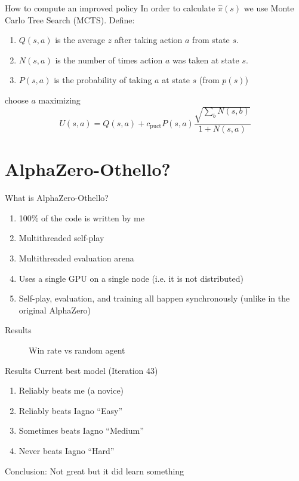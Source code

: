\documentclass{beamer}
\begin{document}
\begin{frame}{How to compute an improved policy}
  In order to calculate \(\hat{\pi}(s)\) we use Monte Carlo Tree Search (MCTS). Define:
  \begin{enumerate}
  \item $Q(s, a)$ is the average \(z\) after taking action $a$ from state $s$.
  \item $N(s, a)$ is the number of times action $a$ was taken at state $s$.
  \item $P(s, a)$ is the probability of taking \(a\) at state \(s\) (from \(p(s)\))
  \end{enumerate}
  choose \(a\) maximizing
  \[U(s, a) = Q(s, a) + c_{\mathrm{puct}} P(s, a)\frac{\sqrt{\sum_b N(s, b)}}{1 + N(s, a)}\]
\end{frame}

\section{AlphaZero-Othello?}
\begin{frame}{What is AlphaZero-Othello?}
  \begin{enumerate}
  \item 100\% of the code is written by me
  \item Multithreaded self-play
  \item Multithreaded evaluation arena
  \item Uses a single GPU on a single node (i.e. it is not distributed)
  \item Self-play, evaluation, and training all happen synchronously (unlike in the original AlphaZero)
  \end{enumerate}
\end{frame}

\begin{frame}{Results}
  \begin{figure}
    \centering
    \resizebox{0.8\textwidth}{!}{}
    \caption{Win rate vs random agent}
    \label{fig:wr}
  \end{figure}
\end{frame}

\begin{frame}{Results}
  Current best model (Iteration 43)
  \begin{enumerate}
  \item Reliably beats me (a novice)
  \item Reliably beats Iagno ``Easy''
  \item Sometimes beats Iagno ``Medium''
  \item Never beats Iagno ``Hard''
  \end{enumerate}
  Conclusion: Not great but it did learn something
\end{frame}
\end{document}
